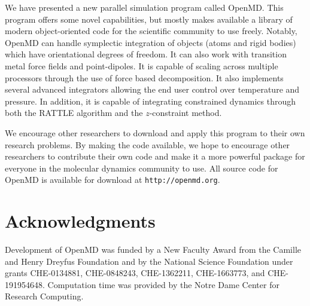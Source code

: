 \documentclass[letterpaper]{report}
\begin{document}
We have presented a new parallel simulation program called 
OpenMD. This program offers some novel capabilities, but mostly makes
available a library of modern object-oriented code for the scientific
community to use freely.  Notably, OpenMD can handle symplectic
integration of objects (atoms and rigid bodies) which have
orientational degrees of freedom.  It can also work with transition
metal force fields and point-dipoles. It is capable of scaling across
multiple processors through the use of force based decomposition. It
also implements several advanced integrators allowing the end user
control over temperature and pressure. In addition, it is capable of
integrating constrained dynamics through both the RATTLE
algorithm and the $z$-constraint method.

We encourage other researchers to download and apply this program to
their own research problems.  By making the code available, we hope to
encourage other researchers to contribute their own code and make it a
more powerful package for everyone in the molecular dynamics community
to use.  All source code for OpenMD is available for download at
{\tt http://openmd.org}.

\chapter{Acknowledgments}

Development of OpenMD was funded by a New Faculty Award from the
Camille and Henry Dreyfus Foundation and by the National Science
Foundation under grants CHE-0134881, CHE-0848243, CHE-1362211,
CHE-1663773, and CHE-191954648. Computation time was provided by the
Notre Dame Center for Research Computing.



\end{document}
